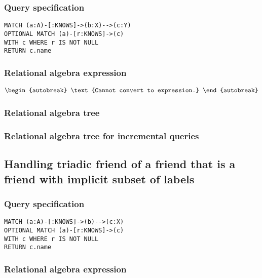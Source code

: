 \subsubsection*{Query specification}

\begin{lstlisting}
MATCH (a:A)-[:KNOWS]->(b:X)-->(c:Y)
OPTIONAL MATCH (a)-[r:KNOWS]->(c)
WITH c WHERE r IS NOT NULL
RETURN c.name
\end{lstlisting}

\subsubsection*{Relational algebra expression}

\begin{align*}
\begin{autobreak}
\text{Cannot convert to expression.}
\end{autobreak}
\end{align*}

\subsubsection*{Relational algebra tree}


\subsubsection*{Relational algebra tree for incremental queries}


\subsection{Handling triadic friend of a friend that is a friend with implicit subset of labels}

\subsubsection*{Query specification}

\begin{lstlisting}
MATCH (a:A)-[:KNOWS]->(b)-->(c:X)
OPTIONAL MATCH (a)-[r:KNOWS]->(c)
WITH c WHERE r IS NOT NULL
RETURN c.name
\end{lstlisting}

\subsubsection*{Relational algebra expression}

